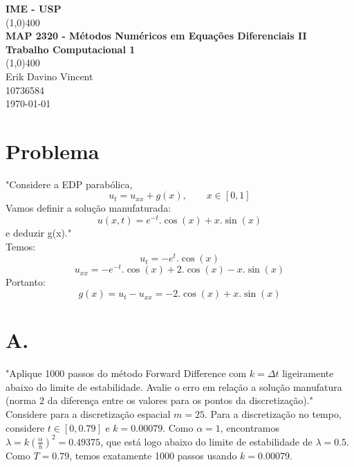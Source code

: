 \documentclass[11pt]{article}
\begin{document}
\begin{titlepage}
\begin{center}
\vspace{1cm}
\Large{\textbf{IME - USP}}\\
\vfill
\line(1,0){400}\\[1mm]
\huge{\textbf{MAP 2320 - Métodos Numéricos em Equações Diferenciais II}}\\[3mm]
\Large{\textbf{Trabalho Computacional 1}}\\[1mm]
\line(1,0){400}\\
\vfill
Erik Davino Vincent\\
10736584\\
\today\\

\end{center}
\end{titlepage}

\setcounter{page}{1}

\section*{Problema}

"Considere a EDP parabólica,
	$$u_t = u_{xx} + g(x),\ \ \ \ \ \ \ \ \ x\in[0,1]$$
Vamos definir a solução manufaturada:
	$$u(x,t) = e^{-t}.\cos(x)+x.\sin(x)$$
e deduzir g(x)."\\

Temos:
	$$u_t = -e^t.\cos(x)$$
	$$u_{xx} = -e^{-t}.\cos(x) + 2.\cos(x) - x.\sin(x)$$
Portanto:
	$$g(x) = u_t - u_{xx} = -2.\cos(x) + x.\sin(x)$$

\section*{A.}

"Aplique 1000 passos do método Forward Difference com $k = \Delta t$
ligeiramente abaixo do limite de estabilidade. Avalie o erro em relação
a solução manufatura (norma 2 da diferença entre os valores para os
pontos da discretização)."\\

Considere para a discretização espacial $m = 25$. Para a discretização no tempo, considere $t\in[0,0.79]$ e $k = 0.00079$. Como $\alpha = 1$, encontramos $\lambda = k(\frac{\alpha}{h})^2 = 0.49375$, que está logo abaixo do limite de estabilidade de $\lambda = 0.5$. Como $T = 0.79$, temos exatamente 1000 passos usando $k = 0.00079$.\\
\end{document}
